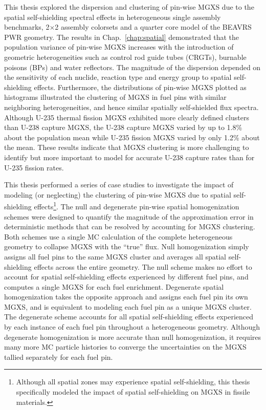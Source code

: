 This thesis explored the dispersion and clustering of pin-wise \ac{MGXS} due to the spatial self-shielding spectral effects in heterogeneous single assembly benchmarks, 2$\times$2 assembly colorsets and a quarter core model of the \ac{BEAVRS} \ac{PWR} geometry. The results in Chap.~\ref{chap:spatial} demonstrated that the population variance of pin-wise \ac{MGXS} increases with the introduction of geometric heterogeneities such as control rod guide tubes (CRGTs), burnable poisons (BPs) and water reflectors. The magnitude of the dispersion depended on the sensitivity of each nuclide, reaction type and energy group to spatial self-shielding effects. Furthermore, the distributions of pin-wise \ac{MGXS} plotted as histograms illustrated the clustering of \ac{MGXS} in fuel pins with similar neighboring heterogeneities, and hence similar spatially self-shielded flux spectra. Although U-235 thermal fission \ac{MGXS} exhibited more clearly defined clusters than U-238 capture \ac{MGXS}, the U-238 capture \ac{MGXS} varied by up to 1.8\% about the population mean while U-235 fission \ac{MGXS} varied by only 1.2\% about the mean. These results indicate that \ac{MGXS} clustering is more challenging to identify but more important to model for accurate U-238 capture rates than for U-235 fission rates.


This thesis performed a series of case studies to investigate the impact of modeling (or neglecting) the clustering of pin-wise \ac{MGXS} due to spatial self-shielding effects\footnote{Although all spatial zones may experience spatial self-shielding, this thesis specifically modeled the impact of spatial self-shielding on MGXS in fissile materials.}. The null and degenerate pin-wise spatial homogenization schemes were designed to quantify the magnitude of the approximation error in deterministic methods that can be resolved by accounting for \ac{MGXS} clustering. Both schemes use a single \ac{MC} calculation of the complete heterogeneous geometry to collapse MGXS with the ``true'' flux. Null homogenization simply assigns all fuel pins to the same \ac{MGXS} cluster and averages all spatial self-shielding effects across the entire geometry. The null scheme makes no effort to account for spatial self-shielding effects experienced by different fuel pins, and computes a single \ac{MGXS} for each fuel enrichment. Degenerate spatial homogenization takes the opposite approach and assigns each fuel pin its own \ac{MGXS}, and is equivalent to modeling each fuel pin as a unique \ac{MGXS} cluster. The degenerate scheme accounts for all spatial self-shielding effects experienced by each instance of each fuel pin throughout a heterogeneous geometry. Although degenerate homogenization is more accurate than null homogenization, it requires many more \ac{MC} particle histories to converge the uncertainties on the \ac{MGXS} tallied separately for each fuel pin.


